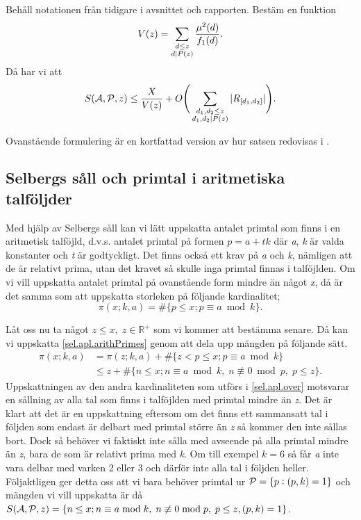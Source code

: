 \begin{theorem}\label{sel.sieve.thm}
Behåll notationen från tidigare i avsnittet och rapporten. 
Bestäm en funktion
\begin{equation}
    V(z) = \sum_{\substack{d\leq z\\ d\divides P(z)}}\frac{\mu^2(d)}{f_1(d)}.\nonumber
\end{equation}
Då har vi att
\begin{equation}
    \S{A}{P}{z} \leq \frac{X}{V(z)} + O\Bigg(\sum_{\substack{d_1,d_2\leq z\\d_1,d_2\divides P(z)}}|R_{[d_1, d_2]}|\Bigg).\nonumber
\end{equation}
\end{theorem}
Ovanstående formulering är en kortfattad version av hur satsen redovisas i \cite{cojocarumurty}.


\subsection{Selbergs såll och primtal i aritmetiska talföljder}

Med hjälp av Selbergs såll kan vi lätt uppskatta antalet primtal som finns i en aritmetisk talföjld, d.v.s. antalet primtal på formen \(p = a + tk\) där \textit{a}, \textit{k} är valda konstanter och \textit{t} är godtyckligt. 
Det finns också ett krav på \textit{a} och \textit{k}, nämligen att de är relativt prima, utan det kravet så skulle inga primtal finnas i talföjlden. 
Om vi vill uppskatta antalet primtal på ovanstående form mindre än något \textit{x}, då är det samma som att uppskatta storleken på följande kardinalitet;
\begin{equation}
    \pi(x;k,a) = \#\{p\leq x; p \equiv a \bmod{k}\}.\label{sel.apl.arithPrimes}
\end{equation}

Låt oss nu ta något \(z\leq x,\; z \in \mathbb{R}^+\) som vi kommer att bestämma senare. Då kan vi uppskatta \eqref{sel.apl.arithPrimes} genom att dela upp mängden på följande sätt.
\begin{align}
    \pi(x;k,a) &= \pi(z;k,a) + \#\{z<p\leq x; p \equiv a \bmod{k}\} \nonumber\\
    &\leq z + \#\{n\leq x; n \equiv a \bmod k,\; n \not\equiv 0 \bmod p,\; p\leq z\}.\label{sel.apl.over}
\end{align}
Uppskattningen av den andra kardinaliteten som utförs i \eqref{sel.apl.over} motsvarar en sållning av alla tal som finns i talföjlden med primtal mindre än \textit{z}. 
Det är klart att det är en uppskattning eftersom om det finns ett sammansatt tal i följden som endast är delbart med primtal större än \textit{z} så kommer den inte sållas bort. 
Dock så behöver vi faktiskt inte sålla med avseende på alla primtal mindre än \textit{z}, bara de som är relativt prima med \textit{k}. Om till exempel \(k = 6\) så får \textit{a} inte vara delbar med varken 2 eller 3 och därför inte alla tal i följden heller. 
Följaktligen ger detta oss att vi bara behöver primtal ur \(\P = \{p: (p, k) = 1\}\) och mängden vi vill uppskatta är då \(\S{A}{P}{z} = \{n\leq x; n \equiv a \bmod k,\; n \not\equiv 0 \bmod p,\; p\leq z, (p,k) = 1\}\).


